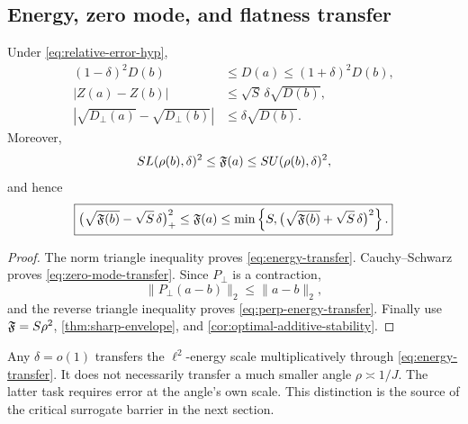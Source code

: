 \subsection{Energy, zero mode, and flatness transfer}

\begin{proposition}
\label{prop:elementary-transfer-ledger}
Under \eqref{eq:relative-error-hyp},
\begin{align}
 (1-\delta)^2D(b)
 &\le D(a)\le(1+\delta)^2D(b),
\label{eq:energy-transfer}\\
 |Z(a)-Z(b)|
 &\le\sqrt S\,\delta\sqrt{D(b)},
\label{eq:zero-mode-transfer}\\
 \left|
 \sqrt{D_\perp(a)}-\sqrt{D_\perp(b)}
 \right|
 &\le\delta\sqrt{D(b)}.
\label{eq:perp-energy-transfer}
\end{align}
Moreover,
\begin{equation}
 S L(\rho(b),\delta)^2
 \le\mathfrak F(a)\le
 S U(\rho(b),\delta)^2,
\label{eq:exact-flatness-transfer}
\end{equation}
and hence
\begin{equation}
 \boxed{
 \bigl(\sqrt{\mathfrak F(b)}-\sqrt S\,\delta\bigr)_+^2
 \le\mathfrak F(a)\le
 \min\left\{
 S,\bigl(\sqrt{\mathfrak F(b)}+\sqrt S\,\delta\bigr)^2
 \right\}.}
\label{eq:additive-flatness-transfer}
\end{equation}
\end{proposition}

\begin{proof}
The norm triangle inequality proves
\eqref{eq:energy-transfer}.  Cauchy--Schwarz proves
\eqref{eq:zero-mode-transfer}.  Since \(P_\perp\) is a contraction,
\[
 \|P_\perp(a-b)\|_2\le\|a-b\|_2,
\]
and the reverse triangle inequality proves
\eqref{eq:perp-energy-transfer}.  Finally use
\(\mathfrak F=S\rho^2\), \cref{thm:sharp-envelope}, and
\cref{cor:optimal-additive-stability}.
\end{proof}

\begin{remark}
\label{rem:different-accuracy-scales}
Any \(\delta=o(1)\) transfers the \(\ell^2\)-energy scale
multiplicatively through \eqref{eq:energy-transfer}.  It does not
necessarily transfer a much smaller angle
\(\rho\asymp1/J\).  The latter task requires error at the angle's
own scale.  This distinction is the source of the critical
surrogate barrier in the next section.
\end{remark}
